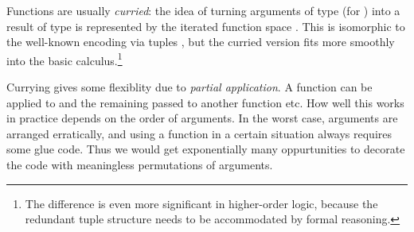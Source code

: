 \begin{isabellebody}
\begin{isamarkuptext}
  Functions are usually \emph{curried}: the idea of turning arguments
  of type  (for ) into a result of
  type  is represented by the iterated function space
  .  This is isomorphic to the well-known
  encoding via tuples , but the curried
  version fits more smoothly into the basic calculus.\footnote{The
  difference is even more significant in higher-order logic, because
  the redundant tuple structure needs to be accommodated by formal
  reasoning.}

  Currying gives some flexiblity due to \emph{partial application}.  A
  function  can be applied to 
  and the remaining  passed to another function
  etc.  How well this works in practice depends on the order of
  arguments.  In the worst case, arguments are arranged erratically,
  and using a function in a certain situation always requires some
  glue code.  Thus we would get exponentially many oppurtunities to
  decorate the code with meaningless permutations of arguments.


\end{isamarkuptext}
\end{isabellebody}
